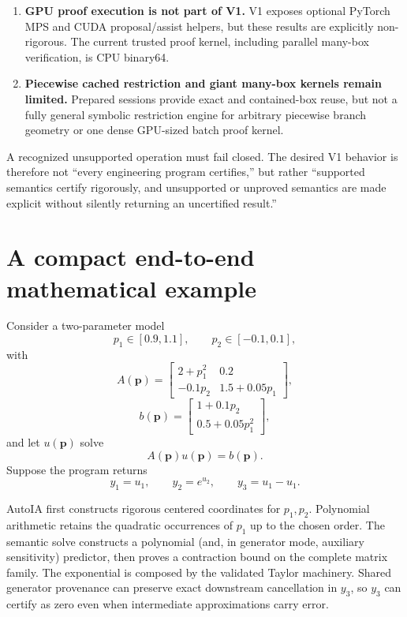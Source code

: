 \documentclass[11pt]{article}
\newcommand{\pv}{\mathbf{p}}
\begin{document}
\begin{enumerate}[leftmargin=*]
branch formula whose closure contains a true \(0/0\) form may fail even if the
piecewise mathematical function has a finite limit.
\item \textbf{GPU proof execution is not part of V1.}  V1 exposes optional
PyTorch MPS and CUDA proposal/assist helpers, but these results are explicitly
non-rigorous.  The current trusted proof kernel, including parallel many-box
verification, is CPU binary64.
\item \textbf{Piecewise cached restriction and giant many-box kernels remain
limited.}  Prepared sessions provide exact and contained-box reuse, but not a
fully general symbolic restriction engine for arbitrary piecewise branch
geometry or one dense GPU-sized batch proof kernel.
\end{enumerate}

A recognized unsupported operation must fail closed.  The desired V1 behavior is
therefore not ``every engineering program certifies,'' but rather ``supported
semantics certify rigorously, and unsupported or unproved semantics are made
explicit without silently returning an uncertified result.''

\section{A compact end-to-end mathematical example}

Consider a two-parameter model
\[
  p_1\in[0.9,1.1],
  \qquad
  p_2\in[-0.1,0.1],
\]
with
\[
  A(\pv)=
  \begin{bmatrix}
  2+p_1^2 & 0.2\\
  -0.1p_2 & 1.5+0.05p_1
  \end{bmatrix},
\]
\[
  b(\pv)=
  \begin{bmatrix}
  1+0.1p_2\\
  0.5+0.05p_1^2
  \end{bmatrix},
\]
and let \(u(\pv)\) solve
\[
  A(\pv)u(\pv)=b(\pv).
\]
Suppose the program returns
\[
  y_1=u_1,
  \qquad
  y_2=e^{u_2},
  \qquad
  y_3=u_1-u_1.
\]

AutoIA first constructs rigorous centered coordinates for \(p_1,p_2\).  Polynomial
arithmetic retains the quadratic occurrences of \(p_1\) up to the chosen order.
The semantic solve constructs a polynomial (and, in generator mode, auxiliary
sensitivity) predictor, then proves a contraction bound on the complete matrix
family.  The exponential is composed by the validated Taylor machinery.  Shared
generator provenance can preserve exact downstream cancellation in \(y_3\), so
\(y_3\) can certify as zero even when intermediate approximations carry error.
\end{document}
